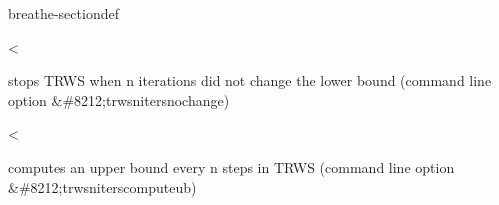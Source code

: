 \documentclass[letterpaper,10pt,openany,oneside,english]{sphinxmanual}
\begin{document}
\begin{fulllineitems}
\begin{sphinxuseclass}{breathe-sectiondef}
\begin{fulllineitems}
\label{\detokenize{ref/ref_cpp:_CPPv4N8ToulBar218trwsNIterComputeUbE}}\label{\detokenize{ref/ref_cpp:_CPPv3N8ToulBar218trwsNIterComputeUbE}}\label{\detokenize{ref/ref_cpp:_CPPv2N8ToulBar218trwsNIterComputeUbE}}\label{\detokenize{ref/ref_cpp:ToulBar2::trwsNIterComputeUb__unsigned-i}}
\pysigstartsignatures
\pysigstartmultiline
{}
\pysigstopmultiline
\pysigstopsignatures
\sphinxAtStartPar
\textless{} 

\sphinxAtStartPar
stops TRW\sphinxhyphen{}S when n iterations did not change the lower bound (command line option \&\#8212;trws\sphinxhyphen{}n\sphinxhyphen{}iters\sphinxhyphen{}no\sphinxhyphen{}change) 

\end{fulllineitems}


\begin{fulllineitems}
\label{\detokenize{ref/ref_cpp:_CPPv4N8ToulBar214costMultiplierE}}\label{\detokenize{ref/ref_cpp:_CPPv3N8ToulBar214costMultiplierE}}\label{\detokenize{ref/ref_cpp:_CPPv2N8ToulBar214costMultiplierE}}\label{\detokenize{ref/ref_cpp:ToulBar2::costMultiplier__double}}
\pysigstartsignatures
\pysigstartmultiline
{}
\pysigstopmultiline
\pysigstopsignatures
\sphinxAtStartPar
\textless{} 

\sphinxAtStartPar
computes an upper bound every n steps in TRW\sphinxhyphen{}S (command line option \&\#8212;trws\sphinxhyphen{}n\sphinxhyphen{}iters\sphinxhyphen{}compute\sphinxhyphen{}ub) 

\end{fulllineitems}



\end{sphinxuseclass}
\end{fulllineitems}
\end{document}
